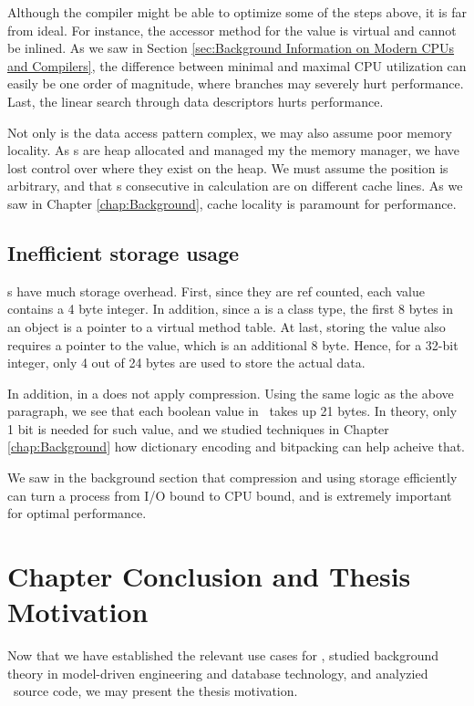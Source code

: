 Although the compiler might be able to optimize some of the steps above, it is far from ideal. For instance, the accessor method for the value is virtual and cannot be inlined. As we saw in Section \ref{sec:Background Information on Modern CPUs and Compilers}, the difference between minimal and maximal CPU utilization can easily be one order of magnitude, where branches may severely hurt performance. Last, the linear search through data descriptors hurts performance.

Not only is the data access pattern complex, we may also assume poor memory locality. As s are heap allocated and managed my the memory manager, we have lost control over where they exist on the heap. We must assume the position is arbitrary, and that s consecutive in calculation are on different cache lines. As we saw in Chapter \ref{chap:Background}, cache locality is paramount for performance.

\subsection{Inefficient storage usage}
\label{sub:Inefficient storage usage}
s have much storage overhead. First, since they are ref counted, each value contains a 4 byte integer. In addition, since a  is a class type, the first 8 bytes in an object is a pointer to a virtual method table. At last, storing the value also requires a pointer to the value, which is an additional 8 byte. Hence, for a 32-bit integer, only 4 out of 24 bytes are used to store the actual data.

In addition,  in a  does not apply compression. Using the same logic as the above paragraph, we see that each boolean value in \gap~takes up 21 bytes. In theory, only 1 bit is needed for such value, and we studied techniques in Chapter \ref{chap:Background} how dictionary encoding and bitpacking can help acheive that.

We saw in the background section that compression and using storage efficiently can turn a process from I/O bound to CPU bound, and is extremely important for optimal performance.

\section{Chapter Conclusion and Thesis Motivation}
\label{sec:Chapter Conclusion and Thesis Motivation}
Now that we have established the relevant use cases for \genus, studied background theory in model-driven engineering and database technology, and analyzied \gap~source code, we may present the thesis motivation.

